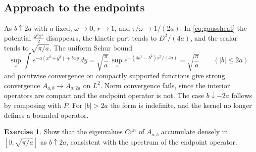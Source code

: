 \documentclass[11pt,reqno]{amsart}
\theoremstyle{definition}
\newtheorem{exercise}[theorem]{Exercise}
\theoremstyle{remark}
\begin{document}
\subsection{Approach to the endpoints}
As $b\uparrow2a$ with $a$ fixed, $\omega\to0$, $r\to1$, and
$\tau/\omega\to1/(2a)$. In \eqref{eq:gaussheat} the potential
$\frac{\omega^2x^2}{2}$ disappears, the kinetic part tends to
$D^2/(4a)$, and the scalar tends to $\sqrt{\pi/a}$. The uniform Schur
bound
\[
\sup_x\int e^{-a(x^2+y^2)+bxy}\,dy=\sqrt{\frac\pi a}\,
\sup_xe^{-(4a^2-b^2)x^2/(4a)}=\sqrt{\frac\pi a}\qquad(|b|\le2a)
\]
and pointwise convergence on compactly supported functions give strong
convergence $A_{a,b}\to A_{a,2a}$ on $L^2$. Norm convergence fails,
since the interior operators are compact and the endpoint operator is
not. The case $b\downarrow-2a$ follows by composing with $P$. For
$|b|>2a$ the form is indefinite, and the kernel no longer defines a
bounded operator.

\begin{exercise}
Show that the eigenvalues $Cr^n$ of $A_{a,b}$ accumulate densely in
$[0,\sqrt{\pi/a}]$ as $b\uparrow2a$, consistent with the spectrum of
the endpoint operator.
\end{exercise}
\end{document}
